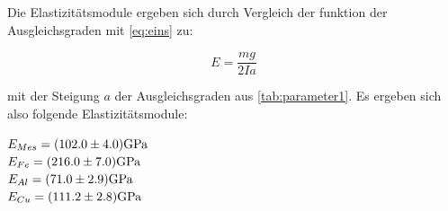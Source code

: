 Die Elastizitätsmodule ergeben sich durch Vergleich der funktion der Ausgleichsgraden mit 
\autoref{eq:eins} zu:
\begin{center}
    \begin{equation}
      \label{eq:elastizitaet}  
      E=\frac{mg}{2Ia}
    \end{equation}
\end{center}
mit der Steigung $a$ der Ausgleichsgraden aus \autoref{tab:parameter1}. Es ergeben sich also
folgende Elastizitätsmodule:
\begin{center}
    $E_{Mes}=(102.0\pm 4.0)\si[]{GPa}$\\
    $E_{Fe}=(216.0\pm 7.0)\si[]{GPa}$\\
    $E_{Al}=(71.0\pm 2.9)\si[]{GPa}$\\
    $E_{Cu}=(111.2\pm 2.8)\si[]{GPa}$\\
\end{center}
